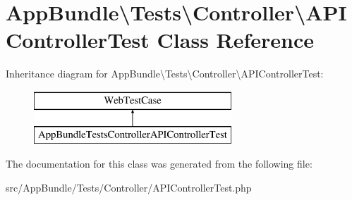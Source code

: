 \hypertarget{class_app_bundle_1_1_tests_1_1_controller_1_1_a_p_i_controller_test}{}\section{App\+Bundle\textbackslash{}Tests\textbackslash{}Controller\textbackslash{}A\+P\+I\+Controller\+Test Class Reference}
\label{class_app_bundle_1_1_tests_1_1_controller_1_1_a_p_i_controller_test}
Inheritance diagram for App\+Bundle\textbackslash{}Tests\textbackslash{}Controller\textbackslash{}A\+P\+I\+Controller\+Test\+:\begin{figure}[H]
\begin{center}
\leavevmode
\includegraphics[height=2.000000cm]{class_app_bundle_1_1_tests_1_1_controller_1_1_a_p_i_controller_test}
\end{center}
\end{figure}


The documentation for this class was generated from the following file\+:\begin{DoxyCompactItemize}
\item 
src/\+App\+Bundle/\+Tests/\+Controller/A\+P\+I\+Controller\+Test.\+php\end{DoxyCompactItemize}

